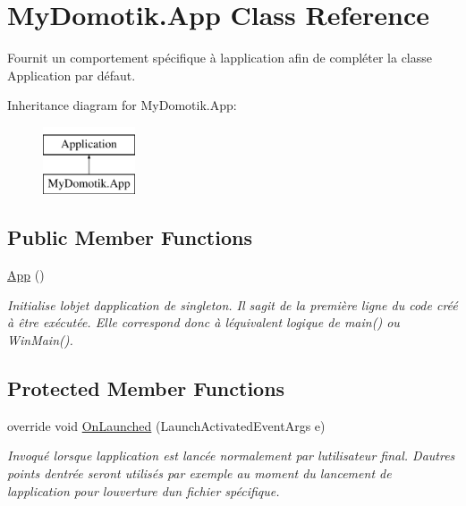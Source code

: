 \hypertarget{class_my_domotik_1_1_app}{}\section{My\+Domotik.\+App Class Reference}
\label{class_my_domotik_1_1_app}


Fournit un comportement spécifique à l\textquotesingle{}application afin de compléter la classe Application par défaut.  


Inheritance diagram for My\+Domotik.\+App\+:\begin{figure}[H]
\begin{center}
\leavevmode
\includegraphics[height=2.000000cm]{class_my_domotik_1_1_app}
\end{center}
\end{figure}
\subsection*{Public Member Functions}
\begin{DoxyCompactItemize}
\item 
\hyperlink{class_my_domotik_1_1_app_aabf4dc41cd74620d8a80b0108edc923b}{App} ()
\begin{DoxyCompactList}\small\item\em Initialise l\textquotesingle{}objet d\textquotesingle{}application de singleton. Il s\textquotesingle{}agit de la première ligne du code créé à être exécutée. Elle correspond donc à l\textquotesingle{}équivalent logique de main() ou Win\+Main(). \end{DoxyCompactList}\end{DoxyCompactItemize}
\subsection*{Protected Member Functions}
\begin{DoxyCompactItemize}
\item 
override void \hyperlink{class_my_domotik_1_1_app_a019ff3d5998b0378b68a017b91f1f53d}{On\+Launched} (Launch\+Activated\+Event\+Args e)
\begin{DoxyCompactList}\small\item\em Invoqué lorsque l\textquotesingle{}application est lancée normalement par l\textquotesingle{}utilisateur final. D\textquotesingle{}autres points d\textquotesingle{}entrée seront utilisés par exemple au moment du lancement de l\textquotesingle{}application pour l\textquotesingle{}ouverture d\textquotesingle{}un fichier spécifique. \end{DoxyCompactList}\end{DoxyCompactItemize}


